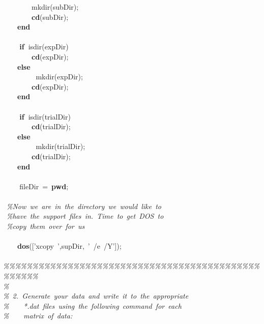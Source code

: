 \documentclass{article}
\newcommand{\hlstd}[1]{\textcolor[rgb]{0,0,0}{#1}}
\newcommand{\hlkey}[1]{\textcolor[rgb]{0,0,1}{\bf{#1}}}
\newcommand{\hlcom}[1]{\textcolor[rgb]{0.4,0.4,0.4}{\it{#1}}}
\begin{document}
{\hlstd{\ \ \ \ \ \ \ \ }}\hlstd{mkdir(subDir);\\
\hlstd{\ \ \ \ \ \ \ \ }}\hlkey{cd}\hlstd{(subDir);\\
\hlstd{\ \ \ \ }}\hlkey{end\mbox{}\\
\\
\hlstd{\ \ \ \ }if\ }\hlstd{isdir(expDir)\\
\hlstd{\ \ \ \ \ \ \ \ }}\hlkey{cd}\hlstd{(expDir);\\
\hlstd{\ \ \ \ }}\hlkey{else\\
\hlstd{\ \ \ \ \ \ \ \ }}\hlstd{mkdir(expDir);\\
\hlstd{\ \ \ \ \ \ \ \ }}\hlkey{cd}\hlstd{(expDir);\\
\hlstd{\ \ \ \ }}\hlkey{end\mbox{}\\
\\
\hlstd{\ \ \ \ }if\ }\hlstd{isdir(trialDir)\\
\hlstd{\ \ \ \ \ \ \ \ }}\hlkey{cd}\hlstd{(trialDir);\\
\hlstd{\ \ \ \ }}\hlkey{else\\
\hlstd{\ \ \ \ \ \ \ \ }}\hlstd{mkdir(trialDir);\\
\hlstd{\ \ \ \ \ \ \ \ }}\hlkey{cd}\hlstd{(trialDir);\\
\hlstd{\ \ \ \ }}\hlkey{end\mbox{}\\
\\
\hlstd{\ \ \ \ }}\hlstd{fileDir\ =\ }\hlkey{pwd}\hlstd{;\mbox{}\\
\\
\ }\hlcom{\%Now\ we\ are\ in\ the\ directory\ we\ would\ like\ to\\
}\hlstd{\ }\hlcom{\%have\ the\ support\ files\ in.\ Time\ to\ get\ DOS\ to\\
}\hlstd{\ }\hlcom{\%copy\ them\ over\ for\ us\mbox{}\\
}\hlstd{\\
\hlstd{\ \ \ \ }}\hlkey{dos}\hlstd{(['xcopy\ ',supDir,\ '\ /e\ /Y']);\mbox{}\\
\\
}\hlcom{\%\%\%\%\%\%\%\%\%\%\%\%\%\%\%\%\%\%\%\%\%\%\%\%\%\%\%\%\%\%\%\%\%\%\%\%\%\%\%\%\%\%\%\%\%\%\%\%\%\%\\
}\hlstd{}\hlcom{\%\\
}\hlstd{}\hlcom{\%\ 2.\ Generate\ your\ data\ and\ write\ it\ to\ the\ appropriate\\
}\hlstd{}\hlcom{\%\hlstd{\ \ \ \ }*.dat\ files\ using\ the\ following\ command\ for\ each\\
}\hlstd{}\hlcom{\%\hlstd{\ \ \ \ }matrix\ of\ data:\\
}
\end{document}
